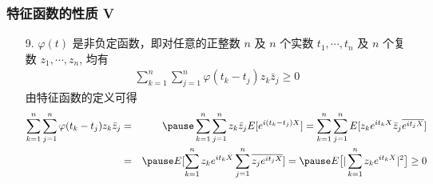 \begin{frame}
	\frametitle{特征函数的性质 V}

	\begin{enumerate}
		\item[9.] $\varphi (t)$ 是非负定函数，即对任意的正整数 $n$ 及 $n$ 个实数 $t_1,\cdots, t_n$ 及 $n$ 个复数 $z_1,\cdots, z_n$, 均有
		\begin{eqnarray*}
			\sum_{k=1}^n\sum_{j=1}^n\varphi(t_k-t_j)z_k\bar{z}_j\ge 0
		\end{eqnarray*}
		\zheng 由特征函数的定义可得
		{\small\begin{eqnarray*}
				\sum_{k=1}^n\sum_{j=1}^n\varphi(t_k-t_j)z_k\bar{z}_j&=&\pause \sum_{k=1}^n\sum_{j=1}^nz_k\bar{z}_jE[e^{i(t_k-t_j)X}]=\sum_{k=1}^n\sum_{j=1}^nE[z_ke^{it_kX}\bar{z}_j\overline{e^{it_jX}}]\\
				&=&\pause E[\sum_{k=1}^nz_ke^{it_kX}\sum_{j=1}^n\overline{z_je^{it_jX}}]=\pause E\big[|\sum_{k=1}^nz_ke^{it_kX}|^2\big]\ge 0
		\end{eqnarray*}}

	\end{enumerate}
\end{frame}




